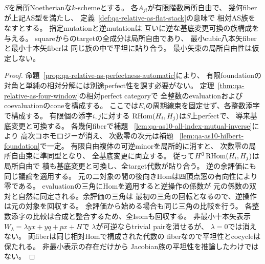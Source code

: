 \begin{theorem}[相対AS族での固定mutation]
\label{thm:qa-as10-relative-families}
$S$を局所Noetherianな$k$-schemeとする。
各$A_{ji}$が有限階数局所自由で、
幾何fiberが上記AS型を満たし、
定義~\ref{def:qa-relative-as-flat-stack}の意味で
相対AS族をなすとする。
指定mutationと逆mutationは
互いに逆な基底変更可換の族構成を与える。
squareからのtargetの全成分は局所自由であり、
最小cubic八本矢fiberと最小十本矢fiberは
同じ族の中で平坦に貼り合う。
最小矢束の局所自由性は仮定しない。
\end{theorem}
\begin{proof}
命題~\ref{prop:qa-relative-as-perfectness-automatic}により、
有限foundationの対角と単純の相対分解には別途perfect性を課す必要がない。
定理~\ref{thm:qa-relative-as-four-window}の相対perfect categoryで
全整数のevaluationおよびcoevaluationのconeを構成する。
ここでは$E_i$の周期線束を固定せず、各整数添字で構成する。
有限個の添字$i,j$に対する
$\operatorname{RHom}(H_i,H_j)$は$S$上perfectで、
導来基底変更と可換する。
各幾何fiberで補題
~\ref{lem:qa-as10-all-index-mutual-inverse}により
高次コホモロジーが消え、
次数零の次元は補題
~\ref{lem:qa-as10-hilbert-foundation}で一定。
有限自由複体の可逆minorを局所的に消すと、
次数零の局所自由束に準同型となり、
全基底変更に両立する。
従って$H^0\operatorname{RHom}(H_i,H_j)$は局所自由で
積も基底変更と可換し、全target代数が貼り合う。
逆の余評価にも同じ議論を適用する。
元の二対象の間の後向きHomは四頂点窓の有向性により零である。
evaluationの三角にHomを適用すると逆操作の係数が
元の係数の双対と自然に同定される。余評価の三角は
最初の三角の回転となるので、逆操作は元の対象を回収する。
余評価から始める場合も同じ三角の比較を行う。
各整数添字の比較は合成と整合するため、全Isomも回収する。
非最小十本矢表示
$W_\lambda=\lambda yx+yq+px+H$で
$\lambda$が可逆ならtrivial pairを消せるが、
$\lambda=0$では消えない。
両fiberは同じ相対Homで構成された代数の
fiberなので平坦性とcocycleは保たれる。
非最小表示の存在だけから
Jacobian族の平坦性を推論したわけではない。
\end{proof}
